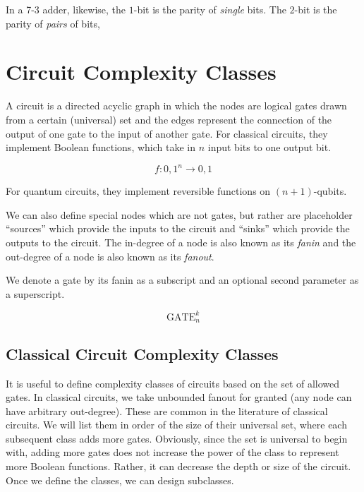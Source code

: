  In a 7-3 adder,
likewise, the $1$-bit is the parity of \emph{single} bits.
The $2$-bit is the parity of \emph{pairs} of bits, 

\section{Circuit Complexity Classes}

A circuit is a directed acyclic graph in which the nodes are
logical gates drawn from a certain (universal) set and the edges 
represent
the connection of the output of one gate to the input of another
gate. For classical circuits, they implement Boolean functions, which take in $n$ input
bits to one output bit.

\begin{equation}
f:{0,1}^n \rightarrow {0,1}
\end{equation}

For quantum circuits, they implement reversible functions on
$(n+1)$-qubits.


 We can also define special nodes which are not gates, but rather
are placeholder ``sources'' which provide the inputs to the circuit and 
``sinks'' which provide the outputs to the circuit. The in-degree of a 
node is also known as its \emph{fanin} and the out-degree of a node is
also known as its \emph{fanout}.

We denote a gate by its fanin as a subscript and an optional
second parameter as a superscript.

\begin{equation}
\text{GATE}_n^k
\end{equation}

\subsection{Classical Circuit Complexity Classes}

It is useful to define complexity classes of circuits based on the
set of allowed gates. In classical circuits, we take unbounded fanout
for granted (any node can have arbitrary out-degree). These are common
in the literature of classical circuits. We will list them in order
of the size of their universal set, where each subsequent class adds
more gates.
Obviously, since the set is universal to begin with, adding more gates
does not increase the power of the class to represent more Boolean
functions. Rather, it can decrease the depth or size of the circuit.
Once we define the classes, we can design subclasses.

